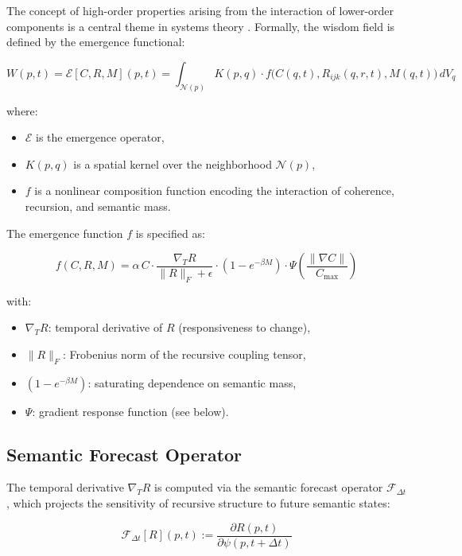 The concept of high-order properties arising from the interaction of lower-order components is a central theme in systems theory \autocite{vonBertalanffy1968}. Formally, the wisdom field is defined by the emergence functional:

\begin{equation}
W(p, t) = \mathcal{E}[C, R, M](p, t) = \int_{\mathcal{N}(p)} K(p, q) \cdot f\big(C(q, t), R_{ijk}(q, r, t), M(q, t)\big) \, dV_q
\end{equation}

where:
\begin{itemize}
    \item \(\mathcal{E}\) is the emergence operator,
    \item \(K(p, q)\) is a spatial kernel over the neighborhood \(\mathcal{N}(p)\),
    \item \(f\) is a nonlinear composition function encoding the interaction of coherence, recursion, and semantic mass.
\end{itemize}

The emergence function \(f\) is specified as:

\begin{equation}
f(C, R, M) = \alpha \, C \cdot \frac{\nabla_T R}{\|R\|_F + \epsilon} \cdot \left(1 - e^{-\beta M}\right) \cdot \Psi\left(\frac{\|\nabla C\|}{C_{\text{max}}}\right)
\end{equation}

with:
\begin{itemize}
    \item \(\nabla_T R\): temporal derivative of \(R\) (responsiveness to change),
    \item \(\|R\|_F\): Frobenius norm of the recursive coupling tensor,
    \item \(\left(1 - e^{-\beta M}\right)\): saturating dependence on semantic mass,
    \item \(\Psi\): gradient response function (see below).
\end{itemize}

\subsection{Semantic Forecast Operator}

The temporal derivative \(\nabla_T R\) is computed via the semantic forecast operator \(\mathcal{F}_{\Delta t}\), which projects the sensitivity of recursive structure to future semantic states:

\begin{equation}
\mathcal{F}_{\Delta t}[R](p, t) := \frac{\partial R(p, t)}{\partial \psi(p, t+\Delta t)}
\end{equation}

